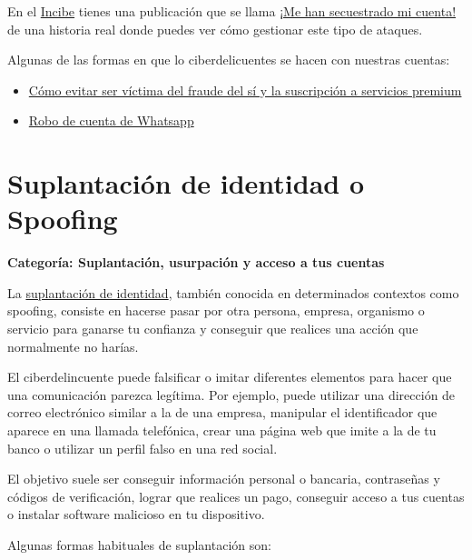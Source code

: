 \documentclass[
  spanish,
  a4paper,
  openany]{book}
\begin{document}
En el \href{https://www.incibe.es}{Incibe} tienes una publicación que se llama \href{https://www.incibe.es/blog/me-han-secuestrado-mi-cuenta}{¡Me han secuestrado mi cuenta!} de una historia real donde puedes ver cómo gestionar este tipo de ataques.

Algunas de las formas en que lo ciberdelicuentes se hacen con nuestras cuentas:

\begin{itemize}
\item
  \href{https://www.incibe.es/linea-de-ayuda-en-ciberseguridad/casos-reales/como-evitar-ser-victima-del-fraude-del-si-y-la-suscripcion-servicios-premium}{Cómo evitar ser víctima del fraude del sí y la suscripción a servicios premium}
\item
  \href{https://twitter.com/RavePrivacy/status/1754584579002830975?t=FD4dA9kbzOCHB39-6-86Eg&s=09}{Robo de cuenta de Whatsapp}
\end{itemize}

\section{Suplantación de identidad o Spoofing}\label{suplantaciuxf3n-de-identidad-o-spoofing}

\textbf{Categoría: Suplantación, usurpación y acceso a tus cuentas}

La \href{https://es.wikipedia.org/wiki/Suplantaci\%C3\%B3n}{suplantación de identidad}, también conocida en determinados contextos como spoofing, consiste en hacerse pasar por otra persona, empresa, organismo o servicio para ganarse tu confianza y conseguir que realices una acción que normalmente no harías.

El ciberdelincuente puede falsificar o imitar diferentes elementos para hacer que una comunicación parezca legítima. Por ejemplo, puede utilizar una dirección de correo electrónico similar a la de una empresa, manipular el identificador que aparece en una llamada telefónica, crear una página web que imite a la de tu banco o utilizar un perfil falso en una red social.

El objetivo suele ser conseguir información personal o bancaria, contraseñas y códigos de verificación, lograr que realices un pago, conseguir acceso a tus cuentas o instalar software malicioso en tu dispositivo.

Algunas formas habituales de suplantación son:
\end{document}
